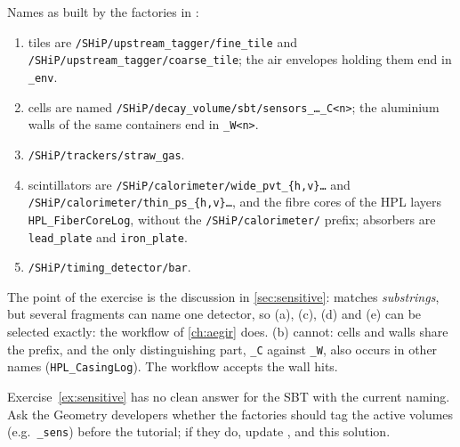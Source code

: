 \begin{solution}
Names as built by the factories in :
\begin{enumerate}[label=(\alph*)]
  \item tiles are \texttt{/SHiP/upstream\_tagger/fine\_tile} and
        \texttt{/SHiP/upstream\_tagger/coarse\_tile}; the air envelopes
        holding them end in \texttt{\_env}.
  \item cells are named
        \texttt{/SHiP/decay\_volume/sbt/sensors\_\ldots\_C<n>}; the aluminium
        walls of the same containers end in \texttt{\_W<n>}.
  \item \texttt{/SHiP/trackers/straw\_gas}.
  \item scintillators are \texttt{/SHiP/calorimeter/wide\_pvt\_\{h,v\}\ldots}
        and \texttt{/SHiP/calorimeter/thin\_ps\_\{h,v\}\ldots}, and the
        fibre cores of the HPL layers \texttt{HPL\_FiberCoreLog}, without the
        \texttt{/SHiP/calorimeter/} prefix; absorbers are \texttt{lead\_plate}
        and \texttt{iron\_plate}.
  \item \texttt{/SHiP/timing\_detector/bar}.
\end{enumerate}
The point of the exercise is the discussion in \cref{sec:sensitive}:
 matches \emph{substrings}, but several fragments can name one
detector, so (a), (c), (d) and (e) can be selected exactly: the workflow of
\cref{ch:aegir} does. (b) cannot: cells and walls share the prefix, and the
only distinguishing part, \texttt{\_C} against \texttt{\_W}, also occurs in
other names (\texttt{HPL\_CasingLog}). The workflow accepts the wall hits.
\end{solution}

\begin{organisernote}
Exercise~\ref{ex:sensitive} has no clean answer for the SBT with the current
naming. Ask the Geometry developers whether the factories should tag the
active volumes (e.g.\ \texttt{\_sens}) before the tutorial; if they do,
update , 
and this solution.
\end{organisernote}
